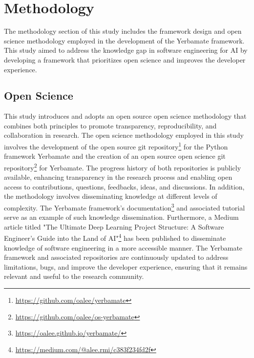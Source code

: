 


\section{Methodology}

The methodology section of this study includes the framework design and open science methodology employed in the development of the Yerbamate framework.
This study aimed to address the knowledge gap in software engineering for AI by developing a framework that prioritizes open science and improves the developer experience. 

\subsection{Open Science}

This study introduces and adopts an open source open science methodology that combines both principles to promote transparency, reproducibility, and collaboration in research. The open science methodology employed in this study involves the development of the open source git repository\footnote{\url{https://github.com/oalee/yerbamate}} for the Python framework Yerbamate and the creation of an open source open science git repository\footnote{\url{https://github.com/oalee/os-yerbamate}} for Yerbamate. The progress history of both repositories is publicly available, enhancing transparency in the research process and enabling open access to contributions, questions, feedbacks, ideas, and discussions.
In addition, the methodology involves disseminating knowledge at different levels of complexity. The Yerbamate framework's documentation\footnote{\url{https://oalee.github.io/yerbamate/}} and associated tutorial serve as an example of such knowledge dissemination. Furthermore, a Medium article titled "The Ultimate Deep Learning Project Structure: A Software Engineer’s Guide into the Land of AI"\footnote{\url{https://medium.com/@alee.rmi/c383f234fd2f}} has been published to disseminate knowledge of software engineering in a more accessible manner.
The Yerbamate framework and associated repositories are continuously updated to address limitations, bugs, and improve the developer experience, ensuring that it remains relevant and useful to the research community. 

